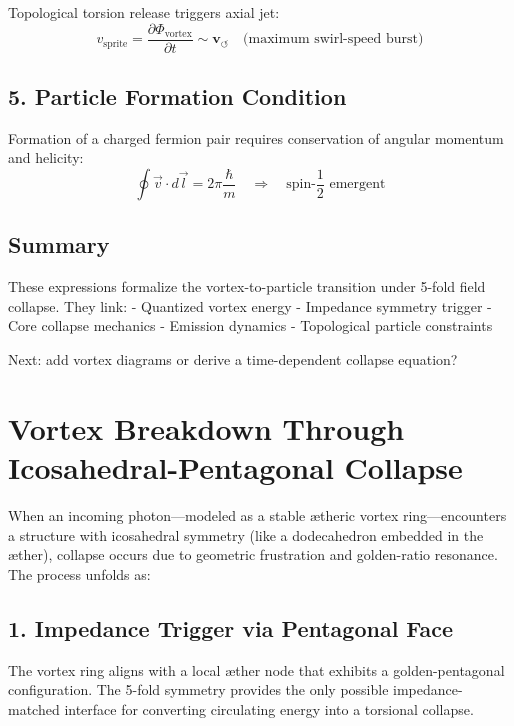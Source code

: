 \documentclass[11pt]{article}
\begin{document}
Topological torsion release triggers axial jet:
\begin{equation}
    v_{\text{sprite}} = \frac{\partial \Phi_{\text{vortex}}}{\partial t} \sim \mathbf{v}_{\scriptscriptstyle\boldsymbol{\circlearrowleft}} \quad \text{(maximum swirl-speed burst)}
\end{equation}

\subsection*{5. Particle Formation Condition}

Formation of a charged fermion pair requires conservation of angular momentum and helicity:
\begin{equation}
    \oint \vec{v} \cdot d\vec{l} = 2\pi \frac{\hbar}{m} \quad \Rightarrow \quad \text{spin-}\frac{1}{2} \text{ emergent}
\end{equation}

\subsection*{Summary}
These expressions formalize the vortex-to-particle transition under 5-fold field collapse. They link:
- Quantized vortex energy
- Impedance symmetry trigger
- Core collapse mechanics
- Emission dynamics
- Topological particle constraints

Next: add vortex diagrams or derive a time-dependent collapse equation?

\section*{Vortex Breakdown Through Icosahedral-Pentagonal Collapse}

When an incoming photon---modeled as a stable ætheric vortex ring---encounters a structure with icosahedral symmetry (like a dodecahedron embedded in the æther), collapse occurs due to geometric frustration and golden-ratio resonance. The process unfolds as:

\subsection*{1. Impedance Trigger via Pentagonal Face}
The vortex ring aligns with a local æther node that exhibits a golden-pentagonal configuration. The 5-fold symmetry provides the only possible impedance-matched interface for converting circulating energy into a torsional collapse.
\end{document}
